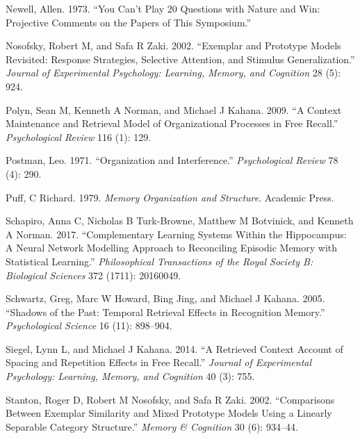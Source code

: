 \documentclass[
  letterpaper,
  DIV=11]{article}
\newlength{\cslhangindent}
\newlength{\cslentryspacingunit} %
\newenvironment{CSLReferences}[2] %
 {%
  \setlength{\parindent}{0pt}
  \ifodd #1
  \let\oldpar\par
  \def\par{\hangindent=\cslhangindent\oldpar}
  \fi
  \setlength{\parskip}{#2\cslentryspacingunit}
 }%
 {}
\begin{document}
\begin{CSLReferences}{1}{0}
\leavevmode{}%
Newell, Allen. 1973. {``You Can't Play 20 Questions with Nature and Win:
Projective Comments on the Papers of This Symposium.''}

\leavevmode{}%
Nosofsky, Robert M, and Safa R Zaki. 2002. {``Exemplar and Prototype
Models Revisited: Response Strategies, Selective Attention, and Stimulus
Generalization.''} \emph{Journal of Experimental Psychology: Learning,
Memory, and Cognition} 28 (5): 924.

\leavevmode{}%
Polyn, Sean M, Kenneth A Norman, and Michael J Kahana. 2009. {``A
Context Maintenance and Retrieval Model of Organizational Processes in
Free Recall.''} \emph{Psychological Review} 116 (1): 129.

\leavevmode{}%
Postman, Leo. 1971. {``Organization and Interference.''}
\emph{Psychological Review} 78 (4): 290.

\leavevmode{}%
Puff, C Richard. 1979. \emph{Memory Organization and Structure}.
Academic Press.

\leavevmode{}%
Schapiro, Anna C, Nicholas B Turk-Browne, Matthew M Botvinick, and
Kenneth A Norman. 2017. {``Complementary Learning Systems Within the
Hippocampus: A Neural Network Modelling Approach to Reconciling Episodic
Memory with Statistical Learning.''} \emph{Philosophical Transactions of
the Royal Society B: Biological Sciences} 372 (1711): 20160049.

\leavevmode{}%
Schwartz, Greg, Marc W Howard, Bing Jing, and Michael J Kahana. 2005.
{``Shadows of the Past: Temporal Retrieval Effects in Recognition
Memory.''} \emph{Psychological Science} 16 (11): 898--904.

\leavevmode{}%
Siegel, Lynn L, and Michael J Kahana. 2014. {``A Retrieved Context
Account of Spacing and Repetition Effects in Free Recall.''}
\emph{Journal of Experimental Psychology: Learning, Memory, and
Cognition} 40 (3): 755.

\leavevmode{}%
Stanton, Roger D, Robert M Nosofsky, and Safa R Zaki. 2002.
{``Comparisons Between Exemplar Similarity and Mixed Prototype Models
Using a Linearly Separable Category Structure.''} \emph{Memory \&
Cognition} 30 (6): 934--44.


\end{CSLReferences}
\end{document}
